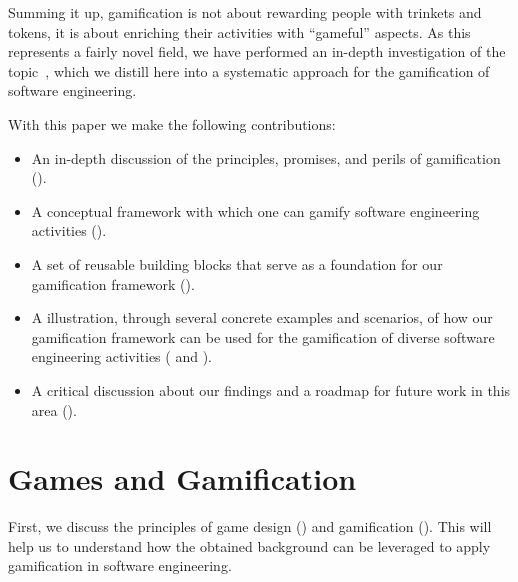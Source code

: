Summing it up, gamification is not about rewarding people with trinkets and tokens, it is about enriching their activities with ``gameful'' aspects.
As this represents a fairly novel field, we have performed an in-depth investigation of the topic~\cite{Mast2014a}, which we distill here into a systematic approach for the gamification of software engineering.

With this paper we make the following contributions:

\begin{itemize}

\item An in-depth discussion of the principles, promises, and perils of gamification ().

\item A conceptual framework with which one can gamify software engineering activities ().

\item A set of reusable building blocks that serve as a foundation for our gamification framework ().

\item A illustration, through several concrete examples and scenarios, of how our gamification framework can be used for the gamification of diverse software engineering activities ( and ).

\item A critical discussion about our findings and a roadmap for future work in this area ().

\end{itemize}


\section{Games and Gamification} \label{sec:gamification-principles}

First, we discuss the principles of game design () and gamification ().
This will help us to understand how the obtained background can be leveraged to apply gamification in software engineering.

